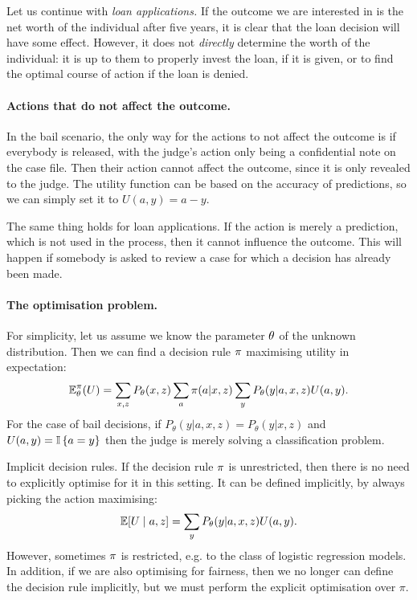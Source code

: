 \begin{frame}
{    Let us continue with \emph{loan applications.} If the outcome we are
    interested in is the net worth of the individual after five years,
    it is clear that the loan decision will have some effect. However,
    it does not \emph{directly} determine the worth of the individual:
    it is up to them to properly invest the loan, if it is given, or
    to find the optimal course of action if the loan is denied.

    \paragraph{Actions that do not affect the outcome.} In the bail
    scenario, the only way for the actions to not affect the outcome
    is if everybody is released, with the judge's action only being a
    confidential note on the case file. Then their action cannot
    affect the outcome, since it is only revealed to the judge. The
    utility function can be based on the accuracy of predictions, so
    we can simply set it to $U(a,y) = a - y$.

    The same thing holds for loan applications. If the action is
    merely a prediction, which is not used in the process, then it
    cannot influence the outcome. This will happen if somebody is
    asked to review a case for which a decision has already been made.
    
    \paragraph{The optimisation problem.} For simplicity, let us assume we know the parameter $\theta$ of the unknown distribution. Then we can find a decision rule $\pi$ maximising utility in expectation:
    \begin{equation} 
      \label{eq:expected-utility-judge}
      \mathop{\mbox{\ensuremath{\mathbb{E}}}}\nolimits_\theta^\pi(U) = \sum_{x,z} P_\theta(x, z) \sum_a \pi(a | x, z) \sum_y P_\theta(y | a, x, z) U(a,y).
    \end{equation}
    For the case of bail decisions, if $P_\theta(y | a, x, z) =P_\theta(y | x, z)$ and $U(a,y) = \mathop{\mbox{\ensuremath{\mathbb{I}}}}\left\{a = y\right\}$ then the judge is merely solving a classification problem.

    \begin{theoryblock}{Implicit decision rules.}
      If the decision rule $\pi$ is unrestricted, then there is no
      need to explicitly optimise for it in this setting. It can be defined implicitly, by always picking the action maximising:
      \[
        \mathop{\mbox{\ensuremath{\mathbb{E}}}}\nolimits[U \mid a, z] = \sum_y P_\theta(y | a, x, z) U(a,y).
      \]
      However, sometimes $\pi$ is restricted, e.g. to the class of logistic regression models. In addition, if we are also optimising for fairness, then we no longer can define the decision rule implicitly, but we must perform the explicit optimisation over $\pi$.
\end{theoryblock}


}
\end{frame}
